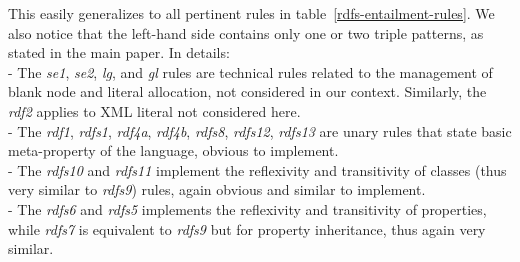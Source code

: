 \documentclass[sn-mathphys]{sn-jnl}
\begin{document}
\begin{appendices}
This easily generalizes to all pertinent rules in table~\ref{rdfs-entailment-rules}. We also notice that the left-hand side contains only one or two triple patterns, as stated in the main paper. In details:
\\- The \textit{se1}, \textit{se2}, \textit{lg},  and \textit{gl} rules are technical rules related to the management of blank node and literal allocation, not considered in our context. Similarly, the \textit{rdf2} applies to XML literal not considered here.
\\- The \textit{rdf1}, \textit{rdfs1}, \textit{rdf4a}, \textit{rdf4b}, \textit{rdfs8}, \textit{rdfs12}, \textit{rdfs13} are unary rules that state basic meta-property of the language, obvious to implement.
\\ - The \textit{rdfs10} and \textit{rdfs11} implement the reflexivity and transitivity of classes (thus very similar to \textit{rdfs9}) rules, again obvious and similar to implement.
\\ - The \textit{rdfs6} and \textit{rdfs5} implements the reflexivity and transitivity of properties, while \textit{rdfs7} is equivalent to \textit{rdfs9} but for property inheritance, thus again very similar.


\end{appendices}
\end{document}
